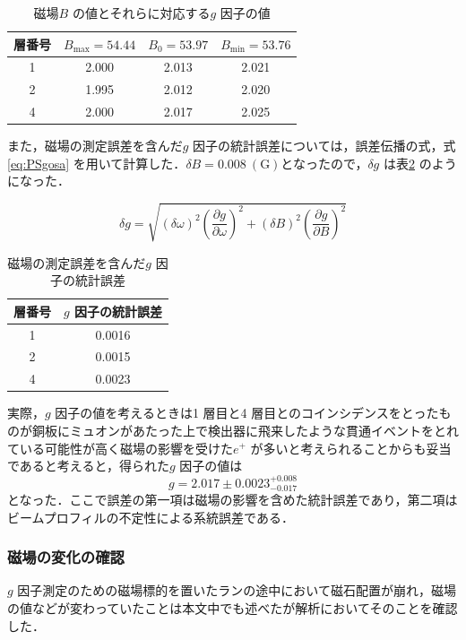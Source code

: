 \begin{table}[h]
	\centering
	\caption{磁場$B$ の値とそれらに対応する$g$ 因子の値}
	\begin{tabular}{cccc}\toprule
	層番号 & $B_{\mathrm{max}} = 54.44$ & $B_{0} = 53.97$ & $B_{\mathrm{min}} = 53.76$ \\ \midrule
	1 & 2.000 & 2.013 & 2.021 \\
	2 & 1.995 & 2.012 & 2.020 \\
	4 & 2.000 & 2.017 & 2.025 \\ \bottomrule 
	\end{tabular}\label{tab:PSgSysErr}
\end{table}%

また，磁場の測定誤差を含んだ$g$ 因子の統計誤差については，誤差伝播の式，式\eqref{eq:PSgosa} を用いて計算した．$\delta B = 0.008~(\mathrm{G})$となったので，$\delta g$ は表\ref{tab:PSgStatErr} のようになった．

\begin{equation}
\delta g = \sqrt{\left(\delta\omega\right)^{2}\left(\frac{\partial g}{\partial\omega}\right)^{2} + \left(\delta B\right)^{2}\left(\frac{\partial g}{\partial B}\right)^{2}}
\label{eq:PSgosa}
\end{equation}%

\begin{table}
	\centering
	\caption{磁場の測定誤差を含んだ$g$ 因子の統計誤差}
	\begin{tabular}{cc}\toprule
	層番号 & $g$ 因子の統計誤差\\ \midrule
	1 & 0.0016 \\ 
	2 & 0.0015 \\
	4 & 0.0023 \\ \bottomrule
	\end{tabular}\label{tab:PSgStatErr}
\end{table}%

実際，$g$ 因子の値を考えるときは1 層目と4 層目とのコインシデンスをとったものが銅板にミュオンがあたった上で検出器に飛来したような貫通イベントをとれている可能性が高く磁場の影響を受けた$e^{+}$ が多いと考えられることからも妥当であると考えると，得られた$g$ 因子の値は
\[g = 2.017 \pm 0.0023 ^{+0.008}_{-0.017}\]
となった．ここで誤差の第一項は磁場の影響を含めた統計誤差であり，第二項はビームプロフィルの不定性による系統誤差である．

\subsubsection{磁場の変化の確認}
\label{subsubsec:PSMagChangeCheck}
$g$ 因子測定のための磁場標的を置いたランの途中において磁石配置が崩れ，磁場の値などが変わっていたことは本文中でも述べたが解析においてそのことを確認した．

